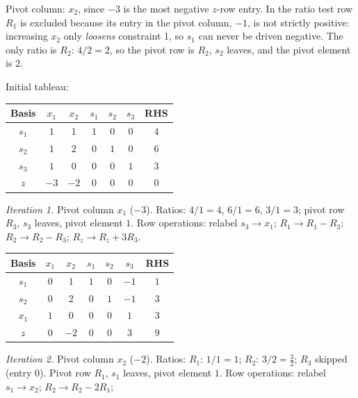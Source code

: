 \begin{solutions}
  \item Pivot column: $x_2$, since $-3$ is the most negative $z$-row
        entry. In the ratio test row $R_1$ is excluded because its entry
        in the pivot column, $-1$, is not strictly positive: increasing
        $x_2$ only \emph{loosens} constraint 1, so $s_1$ can never be
        driven negative. The only ratio is $R_2$: $4/2=2$, so the pivot
        row is $R_2$, $s_2$ leaves, and the pivot element is $2$.

  \item Initial tableau:
        \begin{center}
        \begin{tabular}{c|ccccc|c}
        Basis & $x_1$ & $x_2$ & $s_1$ & $s_2$ & $s_3$ & RHS\\
        \hline
        $s_1$ & $1$ & $1$ & $1$ & $0$ & $0$ & $4$\\
        $s_2$ & $1$ & $2$ & $0$ & $1$ & $0$ & $6$\\
        $s_3$ & $1$ & $0$ & $0$ & $0$ & $1$ & $3$\\
        \hline
        $z$ & $-3$ & $-2$ & $0$ & $0$ & $0$ & $0$\\
        \end{tabular}
        \end{center}
        \emph{Iteration 1.} Pivot column $x_1$ ($-3$). Ratios:
        $4/1=4$, $6/1=6$, $3/1=3$; pivot row $R_3$, $s_3$ leaves, pivot
        element $1$. Row operations: relabel $s_3\to x_1$;
        $R_1\to R_1-R_3$; $R_2\to R_2-R_3$; $R_z\to R_z+3R_3$.
        \begin{center}
        \begin{tabular}{c|ccccc|c}
        Basis & $x_1$ & $x_2$ & $s_1$ & $s_2$ & $s_3$ & RHS\\
        \hline
        $s_1$ & $0$ & $1$ & $1$ & $0$ & $-1$ & $1$\\
        $s_2$ & $0$ & $2$ & $0$ & $1$ & $-1$ & $3$\\
        $x_1$ & $1$ & $0$ & $0$ & $0$ & $1$ & $3$\\
        \hline
        $z$ & $0$ & $-2$ & $0$ & $0$ & $3$ & $9$\\
        \end{tabular}
        \end{center}
        \emph{Iteration 2.} Pivot column $x_2$ ($-2$). Ratios: $R_1$:
        $1/1=1$; $R_2$: $3/2=\tfrac{3}{2}$; $R_3$ skipped (entry $0$).
        Pivot row $R_1$, $s_1$ leaves, pivot element $1$. Row
        operations: relabel $s_1\to x_2$; $R_2\to R_2-2R_1$;

\end{solutions}
